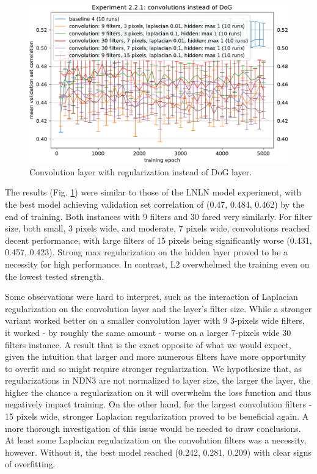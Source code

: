\begin{figure}[H]
    \centering
    \includegraphics[width=1\textwidth]{../figures/05_2_2_1}
    \caption[Experiment 2.2.1]{Convolution layer with regularization instead of DoG layer.}
    \label{fig:5.2.2.1}
\end{figure}

The results (Fig. \ref{fig:5.2.2.1}) were similar to those of the LNLN model experiment, with the best model achieving validation set correlation of (0.47, 0.484, 0.462) by the end of training. Both instances with 9 filters and 30 fared very similarly. For filter size, both small, 3 pixels wide, and moderate, 7 pixels wide, convolutions reached decent performance, with large filters of 15 pixels being significantly worse (0.431, 0.457, 0.423). Strong max regularization on the hidden layer proved to be a necessity for high performance. In contrast, L2 overwhelmed the training even on the lowest tested strength. 

Some observations were hard to interpret, such as the interaction of Laplacian regularization on the convolution layer and the layer’s filter size. While a stronger variant worked better on a smaller convolution layer with 9 3-pixels wide filters, it worked - by roughly the same amount - worse on a larger 7-pixels wide 30 filters instance. A result that is the exact opposite of what we would expect, given the intuition that larger and more numerous filters have more opportunity to overfit and so might require stronger regularization. We hypothesize that, as regularizations in NDN3 are not normalized to layer size, the larger the layer, the higher the chance a regularization on it will overwhelm the loss function and thus negatively impact training. On the other hand, for the largest convolution filters - 15 pixels wide, stronger Laplacian regularization proved to be beneficial again. A more thorough investigation of this issue would be needed to draw conclusions. At least some Laplacian regularization on the convolution filters was a necessity, however. Without it, the best model reached (0.242, 0.281, 0.209) with clear signs of overfitting.

